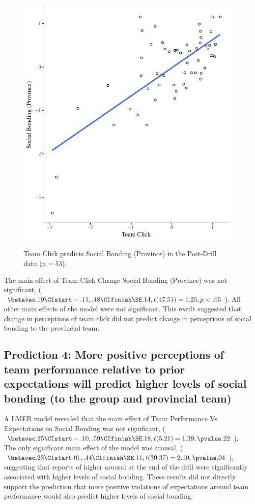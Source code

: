 \begin{CJK}{UTF8}{gbsn}
\begin{figure}
  \centering
    \includegraphics[width=0.5\linewidth,keepaspectratio] {images/groupClickTeamBondScatter}
    \label{fig:groupClickTeamBondScatter}
    \caption{Team Click predicts Social Bonding (Province) in the Post-Drill data ($n = 53$).}
\end{figure}


The main effect of Team Click Change Social Bonding (Province) was not significant, ($\betavec .19 \CIstart -.11, .48 \CIfinish \SE .14, t(47.51) = 1.25, p < .05$).  All other main effects of the model were not significant. This result suggested that change in perceptions of team click did not predict change in perceptions of social bonding to the provincial team.










\subsection{Prediction 4: More positive perceptions of team performance relative to prior expectations will predict higher levels of social bonding (to the group and provincial team)}



A LMER model revealed that the main effect of Team Performance Vs Expectations on Social Bonding was not significant, ($\betavec .25 \CIstart -.10, .59 \CIfinish \SE .18, t(5.21) = 1.39, \pvalue .22$).  The only significant main effect of the model was arousal, ($\betavec .23 \CIstart .01, .44 \CIfinish \SE .11, t(39.37) = 2.10, \pvalue .04$), suggesting that reports of higher arousal at the end of the drill were significantly associated with higher levels of social bonding.  These results did not directly support the prediction that more positive violations of expectations around team performance would also predict higher levels of social bonding.


\end{CJK}
